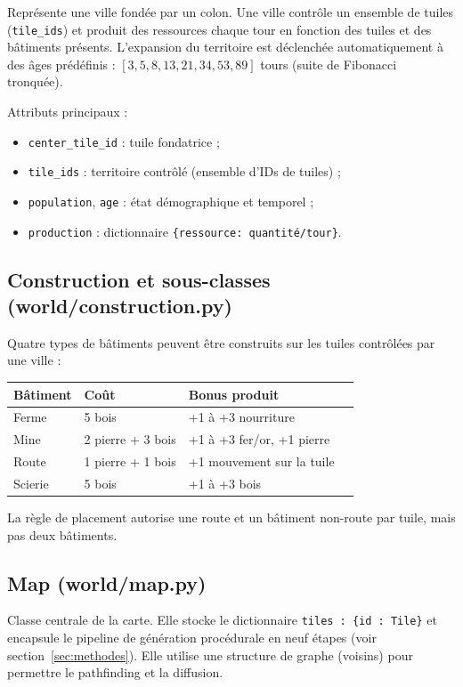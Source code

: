 \documentclass[12pt, a4paper]{article}
\begin{document}
Représente une ville fondée par un colon. Une ville contrôle un ensemble de tuiles
(\texttt{tile\_ids}) et produit des ressources chaque tour en fonction des tuiles et des
bâtiments présents. L'expansion du territoire est déclenchée automatiquement à des âges
prédéfinis : $[3, 5, 8, 13, 21, 34, 53, 89]$ tours (suite de Fibonacci tronquée).

Attributs principaux :
\begin{itemize}
    \item \texttt{center\_tile\_id} : tuile fondatrice ;
    \item \texttt{tile\_ids} : territoire contrôlé (ensemble d'IDs de tuiles) ;
    \item \texttt{population}, \texttt{age} : état démographique et temporel ;
    \item \texttt{production} : dictionnaire \texttt{\{ressource: quantité/tour\}}.
\end{itemize}

\subsection{Construction et sous-classes (world/construction.py)}

Quatre types de bâtiments peuvent être construits sur les tuiles contrôlées par une ville :

\begin{center}
\begin{tabular}{llll}
\toprule
\textbf{Bâtiment} & \textbf{Coût} & \textbf{Bonus produit} \\
\midrule
Ferme     & 5 bois        & +1 à +3 nourriture \\
Mine      & 2 pierre + 3 bois & +1 à +3 fer/or, +1 pierre \\
Route     & 1 pierre + 1 bois & +1 mouvement sur la tuile \\
Scierie   & 5 bois        & +1 à +3 bois \\
\bottomrule
\end{tabular}
\end{center}

La règle de placement autorise une route et un bâtiment non-route par tuile, mais pas deux
bâtiments.

\subsection{Map (world/map.py)}

Classe centrale de la carte. Elle stocke le dictionnaire \texttt{tiles : \{id : Tile\}} et
encapsule le pipeline de génération procédurale en neuf étapes (voir section~\ref{sec:methodes}).
Elle utilise une structure de graphe (voisins) pour permettre le pathfinding et la diffusion.
\end{document}
